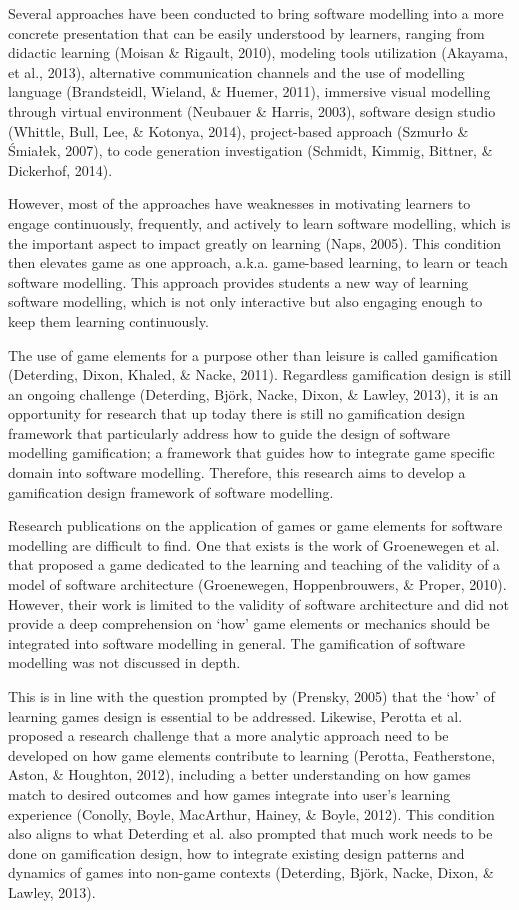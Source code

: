 \documentclass[runningheads,a4paper]{llncs}
\begin{document}
Several approaches have been conducted to bring software modelling into a more concrete presentation that can be easily understood by learners, ranging from didactic learning (Moisan \& Rigault, 2010), modeling tools utilization (Akayama, et al., 2013), alternative communication channels and the use of modelling language (Brandsteidl, Wieland, \& Huemer, 2011), immersive visual modelling through virtual environment (Neubauer \& Harris, 2003), software design studio (Whittle, Bull, Lee, \& Kotonya, 2014), project-based approach (Szmurło \& Śmiałek, 2007), to code generation investigation (Schmidt, Kimmig, Bittner, \& Dickerhof, 2014). 

However, most of the approaches have weaknesses in motivating learners to engage continuously, frequently, and actively to learn software modelling, which is the important aspect to impact greatly on learning (Naps, 2005). This condition then elevates game as one approach, a.k.a. game-based learning, to learn or teach software modelling. This approach provides students a new way of learning software modelling, which is not only interactive but also engaging enough to keep them learning continuously. 

The use of game elements for a purpose other than leisure is called gamification (Deterding, Dixon, Khaled, \& Nacke, 2011). Regardless gamification design is still an ongoing challenge (Deterding, Björk, Nacke, Dixon, \& Lawley, 2013), it is an opportunity for research that up today there is still no gamification design framework that particularly address how to guide the design of software modelling gamification; a framework that guides how to integrate game specific domain into software modelling. Therefore, this research aims to develop a gamification design framework of software modelling.

Research publications on the application of games or game elements for software modelling are difficult to find. One that exists is the work of Groenewegen et al. that proposed a game dedicated to the learning and teaching of  the validity of a model of software architecture (Groenewegen, Hoppenbrouwers, \& Proper, 2010). However, their work is limited to the validity of software architecture and did not provide a deep comprehension on ‘how’ game elements or mechanics should be integrated into software modelling in general. The gamification of software modelling was not discussed in depth. 

This is in line with the question prompted by (Prensky, 2005) that the ‘how’ of learning games design is essential to be addressed. Likewise, Perotta et al. proposed a research challenge that a more analytic approach need to be developed on how game elements contribute to learning (Perotta, Featherstone, Aston, \& Houghton, 2012), including a better understanding on how games match to desired outcomes and how games integrate into user’s learning experience (Conolly, Boyle, MacArthur, Hainey, \& Boyle, 2012). This condition also aligns to what Deterding et al. also prompted that much work needs to be done on gamification design, how to integrate existing design patterns and dynamics of games into non-game contexts (Deterding, Björk, Nacke, Dixon, \& Lawley, 2013).
\end{document}

